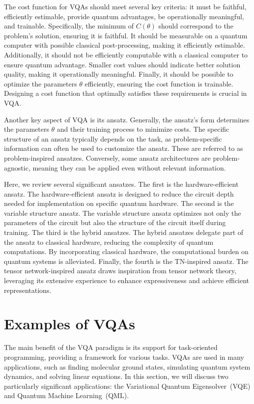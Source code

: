 \documentclass[12pt,dvipdfmx,twoside,openright]{report}
\begin{document}
The cost function for VQAs should meet several key criteria: it must be faithful, efficiently estimable, provide quantum advantages, be operationally meaningful, and trainable.
Specifically, the minimum of $C(\theta )$ should correspond to the problem's solution, ensuring it is faithful.
It should be measurable on a quantum computer with possible classical post-processing, making it efficiently estimable. 
Additionally, it should not be efficiently computable with a classical computer to ensure quantum advantage. 
Smaller cost values should indicate better solution quality, making it operationally meaningful. 
Finally, it should be possible to optimize the parameters $\theta$ efficiently, ensuring the cost function is trainable.
Designing a cost function that optimally satisfies these requirements is crucial in VQA.

Another key aspect of VQA is its ansatz. 
Generally, the ansatz's form determines the parameters $\theta$ and their training process to minimize costs. 
The specific structure of an ansatz typically depends on the task, as problem-specific information can often be used to customize the ansatz. 
These are referred to as problem-inspired ansatzes.
Conversely, some ansatz architectures are problem-agnostic, meaning they can be applied even without relevant information.

Here, we review several significant ansatzes. 
The first is the hardware-efficient ansatz. 
The hardware-efficient ansatz is designed to reduce the circuit depth needed for implementation on specific quantum hardware.
The second is the variable structure ansatz. 
The variable structure ansatz optimizes not only the parameters of the circuit but also the structure of the circuit itself during training.
The third is the hybrid ansatzes. 
The hybrid ansatzes delegate part of the ansatz to classical hardware, reducing the complexity of quantum computations. By incorporating classical hardware, the computational burden on quantum systems is alleviated. 
Finally, the fourth is the TN-inspired ansatz.
The tensor network-inspired ansatz draws inspiration from tensor network theory, leveraging its extensive experience to enhance expressiveness and achieve efficient representations.


\section{Examples of VQAs}
The main benefit of the VQA paradigm is its support for task-oriented programming, providing a framework for various tasks. 
VQAs are used in many applications, such as finding molecular ground states, simulating quantum system dynamics, and solving linear equations.
In this section, we will discuss two particularly significant applications: the Variational Quantum Eigensolver~(VQE) and Quantum Machine Learning~(QML).
\end{document}
